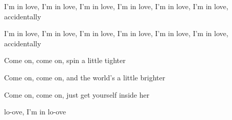 \begin{song}
 I'm in love, I'm in love, I'm in love, I'm in love, I'm in love, I'm in love, accidentally \par
{} I'm in love, I'm in love, I'm in love, I'm in love, I'm in love, I'm in love, accidentally \par

\bigskip

Come on, come on, spin a little tighter \par
{}Come on, come on, and the world's a little brighter \par
{}Come on, come on, just get yourself inside her \par
{}lo-ove, I'm in lo-ove \par

\end{song}
